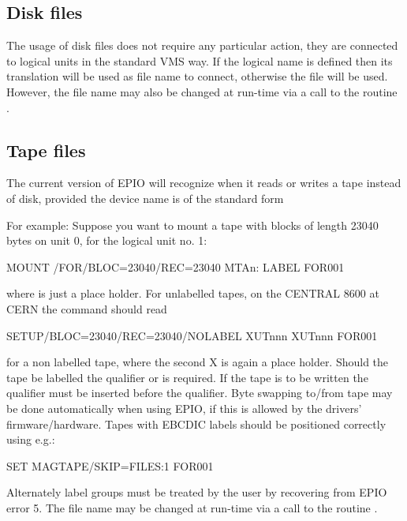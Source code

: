 \subsection{Disk files}

The usage of disk files does not require any particular action,
they are connected to logical units in the standard VMS way. If the
logical name  is defined then its translation will be used as
file name to connect, otherwise the file  will be used.
However, the file name may also be changed at run-time via a call
to the routine .
 
\subsection{Tape files}

The current version of EPIO will recognize when it reads or
writes a tape instead of disk, provided the device name is
of the standard form 
 
For example: Suppose you want to mount a tape with blocks of length
23040 bytes on unit 0, for the logical unit no. 1:

\begin{XMP}
MOUNT /FOR/BLOC=23040/REC=23040 MTAn: LABEL FOR001
\end{XMP}

where  is just a place holder. 
For unlabelled tapes, on the CENTRAL 8600 at CERN the command should read

\begin{XMP}
SETUP/BLOC=23040/REC=23040/NOLABEL XUTnnn XUTnnn FOR001
\end{XMP}

for a non labelled tape, where the second X is again a place
holder. Should the tape be labelled the qualifier
 or  is required.
If the tape is to be written the qualifier  must be
inserted before the  qualifier.
Byte swapping to/from tape may be done automatically when using EPIO,
if this is allowed by the drivers' firmware/hardware.
Tapes with EBCDIC labels should be positioned correctly using e.g.:

\begin{XMP}
SET MAGTAPE/SKIP=FILES:1 FOR001
\end{XMP}

Alternately label groups must be treated by the user by recovering
from EPIO error 5. The file name may be changed at run-time via a call
to the routine .

